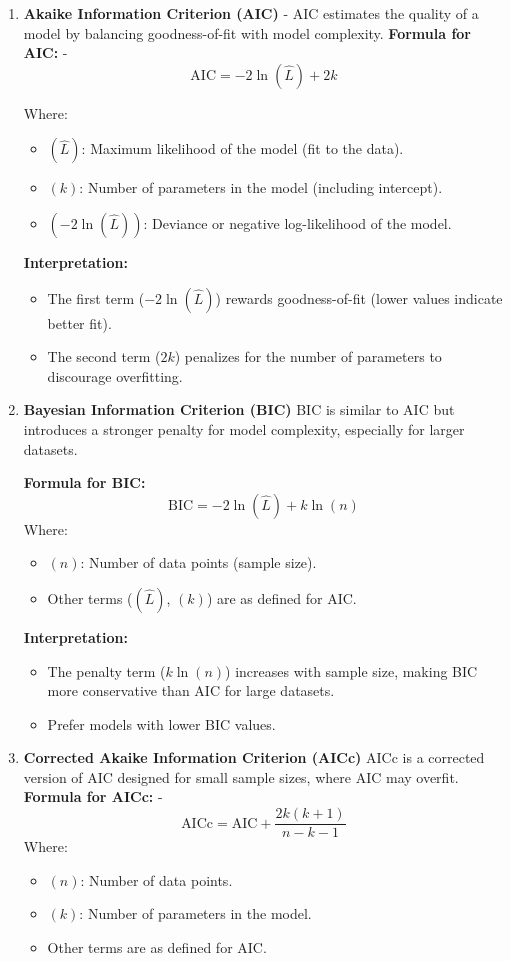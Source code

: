 \documentclass[12pt]{book}
\begin{document}
\begin{enumerate}
    \item \textbf{Akaike Information Criterion (AIC)} - AIC estimates the quality of a model by balancing goodness-of-fit with model complexity.
    \textbf{Formula for AIC:} - 
    \[
    \text{AIC} = -2 \ln(\hat{L}) + 2k
    \]

    Where:
    \begin{itemize}
        \item [-] \(( \hat{L} )\): Maximum likelihood of the model (fit to the data).
        \item [-] \(( k )\): Number of parameters in the model (including intercept).
        \item [-] \(( -2 \ln(\hat{L}) )\): Deviance or negative log-likelihood of the model.
    \end{itemize}
    \textbf{Interpretation:}
    \begin{itemize}
        \item [-] The first term (\( -2 \ln(\hat{L}) \)) rewards goodness-of-fit (lower values indicate better fit).
        \item [-] The second term (\( 2k \)) penalizes for the number of parameters to discourage overfitting.
    \end{itemize}
    \item \textbf{Bayesian Information Criterion (BIC)}
    BIC is similar to AIC but introduces a stronger penalty for model complexity, especially for larger datasets.

    \textbf{Formula for BIC:}
    \[
        \text{BIC} = -2 \ln(\hat{L}) + k \ln(n)
    \]
    Where:
    \begin{itemize}
        \item [-] \(( n )\): Number of data points (sample size).
        \item [-] Other terms (\(( \hat{L} )\), \(( k )\)) are as defined for AIC.
    \end{itemize}
    \textbf{Interpretation:}
    \begin{itemize}
        \item [-] The penalty term (\( k \ln(n) \)) increases with sample size, making BIC more conservative than AIC for large datasets.
        \item [-] Prefer models with lower BIC values.
    \end{itemize}

    \item \textbf{Corrected Akaike Information Criterion (AICc)}
    AICc is a corrected version of AIC designed for small sample sizes, where AIC may overfit. \\
    \textbf{Formula for AICc:} - 
    \[
    \text{AICc} = \text{AIC} + \frac{2k(k+1)}{n - k - 1}
    \]
    Where:
    \begin{itemize}
        \item [-] \(( n )\): Number of data points.
        \item [-] \(( k )\): Number of parameters in the model.
        \item [-] Other terms are as defined for AIC.
    \end{itemize}


\end{enumerate}
\end{document}
